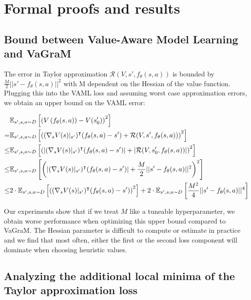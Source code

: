 \chapter{Formal proofs and results}


\section{Bound between Value-Aware Model Learning and VaGraM}
\label{app:taylor_bound}

The error in Taylor approximation $\mathcal{R}(V, s', f_\theta(s,a))$ is bounded by $\frac{M}{2}||s' - f_\theta(s,a)||^2$ with M dependent on the Hessian of the value function. Plugging this into the VAML loss and assuming worst case approximation errors, we obtain an upper bound on the VAML error:

\begin{align*}
    &\mathbb{E}_{s',s,a \sim D}\left[\left(V\left(f_\theta(s,a) \right) - V(s_0')\right)^2\right] \\
    = &\mathbb{E}_{s',s,a \sim D}\left[\left((\nabla_s V(s)|_{s'})^\intercal (f_\theta(s,a) - s') + \mathcal{R}(V, s',f_\theta(s,a))\right)^2\right]\\
    \leq &\mathbb{E}_{s',s,a \sim D}\left[\left(\left|(\nabla_s V(s)|_{s'})^\intercal (f_\theta(s,a) - s')\right| + \left|\mathcal{R}(V, s_0', f_\theta(s,a))\right|\right)^2\right]\\
    \leq &\mathbb{E}_{s',s,a \sim D}\left[{\left(\left|(\nabla_s V(s)|_{s'})^\intercal (f_\theta(s,a) - s')\right| + \frac{M}{2}||s' - f_\theta(s,a)||^2\right)^2}\right]\\
    \leq &2\cdot\mathbb{E}_{s',s,a \sim D}\left[{\left((\nabla_s V(s)|_{s'})^\intercal (f_\theta(s,a) - s')\right)^2}\right] + 2\cdot\mathbb{E}_{s',s,a \sim D}\left[\frac{M^2}{4}||s' - f_\theta(s,a)||^4\right]
\end{align*}

Our experiments show that if we treat $M$ like a tuneable hyperparameter, we obtain worse performance when optimizing this upper bound compared to  VaGraM.
The Hessian parameter is difficult to compute or estimate in practice and we find that most often, either the first or the second loss component will dominate when choosing heuristic values.

\section{Analyzing the additional local minima of the Taylor approximation loss}

